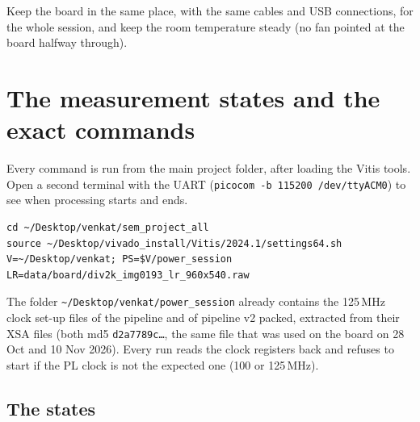 \documentclass[11pt,a4paper]{article}
\begin{document}
Keep the board in the same place, with the same cables and USB connections, for the whole session, and keep the room temperature steady (no fan pointed at the board halfway through).

\section{The measurement states and the exact commands}\label{sec:states}

Every command is run from the main project folder, after loading the Vitis tools. Open a second terminal with the UART (\texttt{picocom -b 115200 /dev/ttyACM0}) to see when processing starts and ends.

\begin{lstlisting}
cd ~/Desktop/venkat/sem_project_all
source ~/Desktop/vivado_install/Vitis/2024.1/settings64.sh
V=~/Desktop/venkat; PS=$V/power_session
LR=data/board/div2k_img0193_lr_960x540.raw
\end{lstlisting}

The folder \texttt{\textasciitilde/Desktop/venkat/power\_session} already contains the 125\,MHz clock set-up files of the pipeline and of pipeline v2 packed, extracted from their XSA files (both md5 \texttt{d2a7789c\ldots}, the same file that was used on the board on 28 Oct and 10 Nov 2026). Every run reads the clock registers back and refuses to start if the PL clock is not the expected one (100 or 125\,MHz).

\subsection*{The states}
\end{document}
